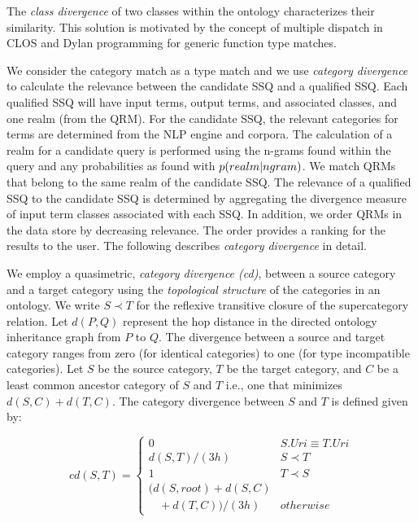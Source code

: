 The \emph{class divergence} of two classes within the ontology characterizes their similarity.  This solution is motivated by the concept of multiple dispatch in CLOS and Dylan programming for generic function type matches. 

We consider the category match as a type match and we use \emph{category divergence} to calculate the relevance between the candidate SSQ and a qualified SSQ. Each qualified SSQ will have input terms, output terms, and associated classes, and one realm (from the QRM).  For the candidate SSQ, the relevant categories for terms are determined from the NLP engine and corpora. The calculation of a realm for a candidate query is performed using the n-grams found within the query and any probabilities as found with $p(realm|n\-gram)$. %
We match QRMs that belong to the same realm of the candidate SSQ. The relevance of a qualified SSQ to the candidate SSQ is determined by aggregating the divergence measure of input term classes associated with each SSQ. In addition, we order QRMs in the data store 
by decreasing relevance. The order provides a ranking for the results 
to the user. The following describes \emph{category divergence} 
in detail.


We employ a quasimetric, \textit{category divergence (cd)}, between a source category and a target category using the \textit{topological structure} of the categories in an ontology. We write $S \prec T$ for the reflexive transitive closure of the supercategory relation. Let $d(P,Q)$ represent the hop distance in the directed ontology inheritance graph from $P$ to $Q$. The divergence between a source and target category ranges from zero (for identical categories) to one (for type incompatible categories). Let $S$ be the source category, $T$ be the target category, and $C$ be a least common ancestor category of $S$ and $T$ i.e., one that minimizes $d(S,C) + d(T,C)$. The category divergence between $S$ and $T$ is defined given by:

\begin{equation}
cd(S, T) = \begin{cases}
0 & S.{Uri} \equiv T.{Uri}\\
d(S, T)/(3h) & S \prec T\\
1 & T \prec S\\
(d(S,root) + d(S,C) \\ \ \ \ \ + d(T,C))/(3h) & otherwise
\end{cases}
\end{equation}

